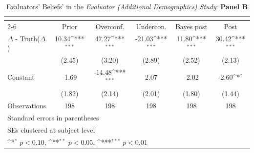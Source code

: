 \begin{table}[htbp]\centering
\def\sym#1{\ifmmode^{#1}\else\(^{#1}\)\fi}
\caption{Evaluators' Beliefs' in the \textit{Evaluator (Additional Demographics) Study}: \textbf{Panel B}}
\begin{tabular}{l*{5}{c}}
\hline\hline
                &\multicolumn{5}{c}{}                                                                          \\\cmidrule(lr){2-6}
                &\multicolumn{1}{c}{Prior}&\multicolumn{1}{c}{Overconf.}&\multicolumn{1}{c}{Undercon.}&\multicolumn{1}{c}{Bayes post}&\multicolumn{1}{c}{Post}\\
\hline
$\Delta$ - Truth($\Delta$)&    10.34\sym{***}&    47.27\sym{***}&   -21.03\sym{***}&    11.80\sym{***}&    30.42\sym{***}\\
                &   (2.45)         &   (3.20)         &   (2.89)         &   (2.52)         &   (2.13)         \\
Constant        &    -1.69         &   -14.48\sym{***}&     2.07         &    -2.02         &    -2.60\sym{*}  \\
                &   (1.82)         &   (2.14)         &   (2.01)         &   (1.80)         &   (1.44)         \\
\hline
Observations    &      198         &      198         &      198         &      198         &      198         \\
\hline\hline
\multicolumn{6}{l}{\footnotesize Standard errors in parentheses}\\
\multicolumn{6}{l}{\footnotesize SEs clustered at subject level}\\
\multicolumn{6}{l}{\footnotesize \sym{*} \(p<0.10\), \sym{**} \(p<0.05\), \sym{***} \(p<0.01\)}\\
\end{tabular}
\end{table}
